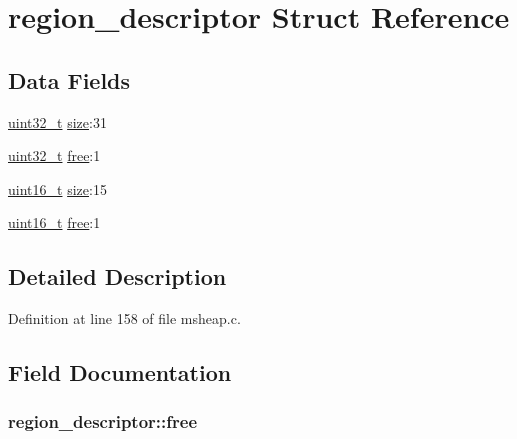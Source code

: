 \hypertarget{structregion__descriptor}{\section{region\-\_\-descriptor Struct Reference}
\label{structregion__descriptor}
}
\subsection*{Data Fields}
\begin{DoxyCompactItemize}
\item 
\hyperlink{stdint_8h_a435d1572bf3f880d55459d9805097f62}{uint32\-\_\-t} \hyperlink{structregion__descriptor_af2e510e77d4eda561cd30797ad5343cd}{size}\-:31
\item 
\hyperlink{stdint_8h_a435d1572bf3f880d55459d9805097f62}{uint32\-\_\-t} \hyperlink{structregion__descriptor_ace06b149d15761ba9859815f0e32c46f}{free}\-:1
\item 
\hyperlink{stdint_8h_a273cf69d639a59973b6019625df33e30}{uint16\-\_\-t} \hyperlink{structregion__descriptor_a0e40e919e69b9dbfdacc77bd31b565a4}{size}\-:15
\item 
\hyperlink{stdint_8h_a273cf69d639a59973b6019625df33e30}{uint16\-\_\-t} \hyperlink{structregion__descriptor_a727eaaf0293ecdb232142c45b80ce598}{free}\-:1
\end{DoxyCompactItemize}


\subsection{Detailed Description}


Definition at line 158 of file msheap.\-c.



\subsection{Field Documentation}
\hypertarget{structregion__descriptor_ace06b149d15761ba9859815f0e32c46f}{
\subsubsection[{free}]{ region\-\_\-descriptor\-::free}}\label{structregion__descriptor_ace06b149d15761ba9859815f0e32c46f}


